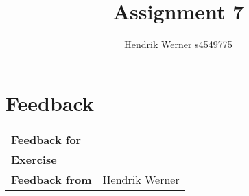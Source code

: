 \documentclass[12pt, a4paper]{article}
\title{Assignment 7}
\author{Hendrik Werner s4549775}
\begin{document}
\maketitle

\clearpage
\section*{Feedback}
\begin{tabular}{l l}
	\textbf{Feedback for} & \\
	\textbf{Exercise} & \\
	\textbf{Feedback from} & Hendrik Werner\\
\end{tabular}
\end{document}
